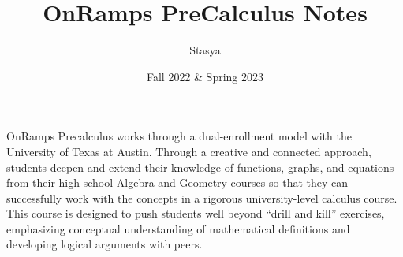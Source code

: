 \documentclass[10pt,a4paper,oneside]{book}
\title{OnRamps PreCalculus Notes}
\author{Stasya}
\date{Fall 2022 \& Spring 2023}
\begin{document}
\maketitle
\bigbreak
\begin{center}
    OnRamps Precalculus works through a dual-enrollment model with the University of Texas at Austin. Through a creative and 
    connected approach, students deepen and extend their knowledge of functions, graphs, and equations from their high school 
    Algebra and Geometry courses so that they can successfully work with the concepts in a rigorous university-level calculus 
    course. This course is designed to push students well beyond “drill and kill” exercises, emphasizing conceptual understanding 
    of mathematical definitions and developing logical arguments with peers.
\end{center}
\bigbreak
\tableofcontents






\end{document}
